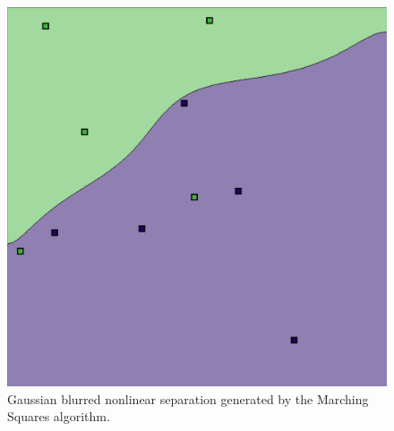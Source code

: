 \documentclass[12pt]{article}
\begin{document}
\begin{figure} 
\centering
  \includegraphics[width = 3 in]{nonlinear_blurred.png}
  \caption{Gaussian blurred nonlinear separation generated by the Marching Squares algorithm.
}
\end{figure}
\end{document}
